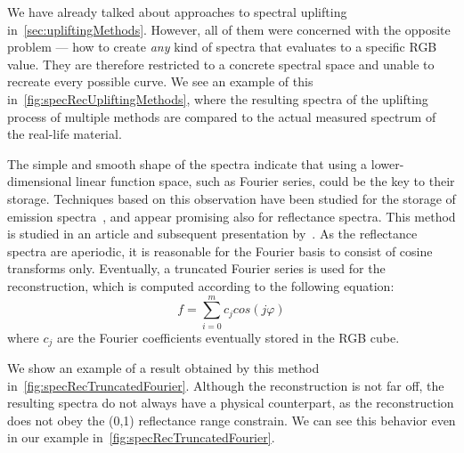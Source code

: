 We have already talked about approaches to spectral uplifting in~\cref{sec:upliftingMethods}. However, all of them were concerned with the opposite problem --- how to create \emph{any} kind of spectra that evaluates to a specific RGB value. They are therefore restricted to a concrete spectral space and unable to recreate every possible curve. We see an example of this in~\cref{fig:specRecUpliftingMethods}, where the resulting spectra of the uplifting process of multiple methods are compared to the actual measured spectrum of the real-life material.

The simple and smooth shape of the spectra indicate that using a lower-dimensional linear function space, such as Fourier series, could be the key to their storage. Techniques based on this observation have been studied for the storage of emission spectra~\cite{fourierRepresEmission}, and appear promising also for reflectance spectra. This method is studied in an article and subsequent presentation by~\citet{trigonometricMomentsPresentation}. As the reflectance spectra are aperiodic, it is reasonable for the Fourier basis to consist of cosine transforms only. Eventually, a truncated Fourier series is used for the reconstruction, which is computed according to the following equation:
\begin{equation} \label{truncatedFourierSeries}
  f = \sum_{i=0}^{m}c_j cos(j\varphi)
\end{equation}
where $c_j$ are the Fourier coefficients eventually stored in the RGB cube.

We show an example of a result obtained by this method in~\cref{fig:specRecTruncatedFourier}. Although the reconstruction is not far off, the resulting spectra do not always have a physical counterpart, as the reconstruction does not obey the (0,1) reflectance range constrain. We can see this behavior even in our example in~\cref{fig:specRecTruncatedFourier}.

